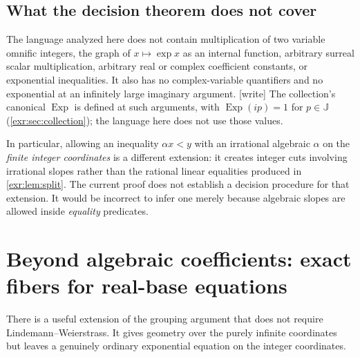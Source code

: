 \documentclass[11pt,letterpaper]{article}
\numberwithin{equation}{section}
\theoremstyle{definition}
\theoremstyle{remark}
\newcommand{\J}{\mathbb J}
\newcommand{\Exp}{\operatorname{Exp}}
\newcommand{\wtag}{\textup{[write]}}%
\begin{document}
\subsection{What the decision theorem does not cover}
The language analyzed here does not contain multiplication of two variable
omnific integers, the graph of $x\mapsto\exp x$ as an internal function, arbitrary
surreal scalar multiplication, arbitrary real or complex coefficient constants,
or exponential inequalities. It also has no complex-variable quantifiers and no
exponential at an infinitely large imaginary argument.
\wtag{} The collection's canonical $\Exp$ is defined at such arguments, with
$\Exp(ip)=1$ for $p\in\J$ (\cref{exr:sec:collection}); the language here does
not use those values.

In particular, allowing an inequality $\alpha x<y$ with an irrational algebraic
$\alpha$ on the \emph{finite integer coordinates} is a different extension: it
creates integer cuts involving irrational slopes rather than the rational linear
equalities produced in \cref{exr:lem:split}. The current proof does not establish a
decision procedure for that extension. It would be incorrect to infer one merely
because algebraic slopes are allowed inside \emph{equality} predicates.

\section{Beyond algebraic coefficients: exact fibers for real-base equations}\label{exr:sec:fibers}
There is a useful extension of the grouping argument that does not require
Lindemann--Weierstrass. It gives geometry over the purely infinite coordinates but
leaves a genuinely ordinary exponential equation on the integer coordinates.
\end{document}
